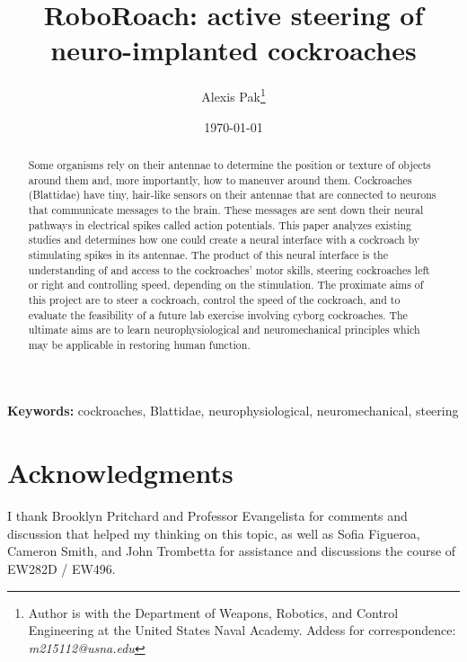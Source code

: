 \documentclass[10pt]{article}
\title{RoboRoach: active steering of neuro-implanted cockroaches}
\author{Alexis Pak\thanks{Author is with the Department of Weapons, Robotics, and Control Engineering at the United States Naval Academy. Addess for correspondence: \emph{m215112@usna.edu}}}
\date{\today}
\begin{document}
\maketitle
\begin{abstract}
Some organisms rely on their antennae to determine the position or texture of objects around them and, more importantly, how to maneuver around them. Cockroaches (Blattidae) have tiny, hair-like sensors on their antennae that are connected to neurons that communicate messages to the brain. These messages are sent down their neural pathways in electrical spikes called action potentials. This paper analyzes existing studies and determines how one could create a neural interface with a cockroach by stimulating spikes in its antennae. The product of this neural interface is the understanding of and access to the cockroaches' motor skills, steering cockroaches left or right and controlling speed, depending on the stimulation. The proximate aims of this project are to steer a cockroach, control the speed of the cockroach, and to evaluate the feasibility of a future lab exercise involving cyborg cockroaches. The ultimate aims are to learn neurophysiological and neuromechanical principles which may be applicable in restoring human function. 
\end{abstract}
{\scriptsize\textbf{Keywords:} cockroaches, Blattidae, neurophysiological, neuromechanical, steering}





\section{Acknowledgments}
I thank Brooklyn Pritchard and Professor Evangelista for comments and discussion that helped my thinking on this topic, as well as Sofia Figueroa, Cameron Smith, and John Trombetta for assistance and discussions the course of EW282D / EW496.



\clearpage
\appendix 
\renewcommand{\figurename}{Supplementary Figure}
\renewcommand{\thefigure}{S\arabic{figure}}
\end{document}
